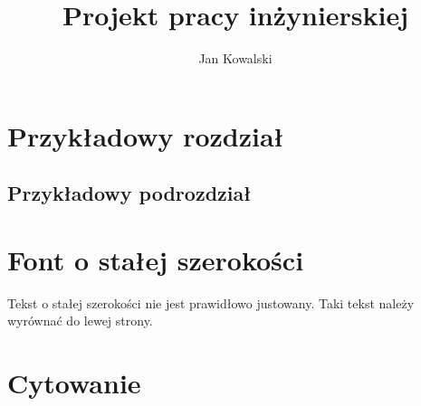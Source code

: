 \documentclass[]{wsbthesis}
\author{Jan Kowalski}
\title{Projekt pracy inżynierskiej}
\begin{document}

\maketitle{}
\printtableofcontent{}

\setcounter{page}{1}

\chapter{Przykładowy rozdział}
\section{Przykładowy podrozdział}

\chapter{Font o stałej szerokości}
Tekst o stałej szerokości nie jest prawidłowo justowany. Taki tekst należy wyrównać do lewej strony.
\begin{flushleft}
    \ttfamily{}
\end{flushleft}

\chapter{Cytowanie}
\end{document}
